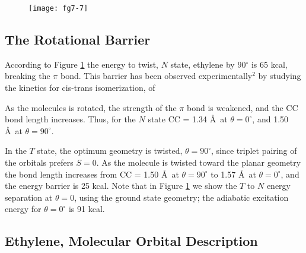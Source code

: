 \begin{figure}
\texttt{[image: fg7-7]}
\caption{}
\label{chap7-fig7}
\end{figure}


\subsection{The Rotational Barrier}

According to Figure \ref{chap7-fig7} the energy to twist, $N$ state,
ethylene by 90$^{\circ}$ is 65 kcal, breaking the $\pi$ bond.  This
barrier has been observed experimentally$^2$ by studying the kinetics
for cis-trans isomerization, of
\begin{equation}
\end{equation}

As the molecules is rotated, the strength of the $\pi$ bond is 
weakened, and the CC bond length increases.  Thus, for the $N$ state
CC = 1.34 \AA\ at $\theta = 0^{\circ}$, and 1.50 \AA\ at 
$\theta = 90^{\circ}$.

In the $T$ state, the optimum geometry is twisted, $\theta =
90^{\circ}$, since triplet pairing of the orbitals prefers $S = 0$.
As the molecule is twisted toward the planar geometry the bond length
increases from CC = 1.50 \AA\ at $\theta = 90^{\circ}$ to 1.57 \AA\ at
$\theta = 0^{\circ}$, and the energy barrier is 25 kcal.  Note that in
Figure \ref{chap7-fig7} we show the $T$ to $N$ energy separation at
$\theta = 0$, using the ground state geometry; the adiabatic
excitation energy for $\theta = 0^{\circ}$ is 91 kcal.

\subsection{Ethylene, Molecular Orbital Description}


